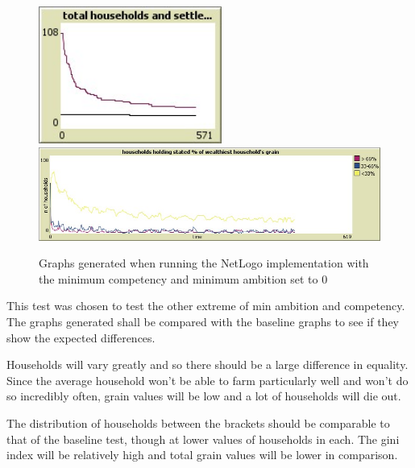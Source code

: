 \documentclass[12pt]{article}
\begin{document}
				\begin{figure}[!htb]
					\includegraphics[width=6cm]{Min_ambition_competency_run1_C}\\
					\includegraphics[width=15cm]{Min_ambition_competency_run1_D}
					\caption{Graphs generated when running the NetLogo implementation with the minimum competency and minimum ambition set to 0}
					\label{fig:Min_ambition_competency_Netlogo_1}
				\end{figure}
				This test was chosen to test the other extreme of min ambition and competency. The graphs generated shall be compared with the baseline graphs to see if they show the expected differences.
				
				Households will vary greatly and so there should be a large difference in equality. Since the average household won’t be able to farm particularly well and won’t do so incredibly often, grain values will be low and a lot of households will die out.
				
				The distribution of households between the brackets should be comparable to that of the baseline test, though at lower values of households in each. The gini index will be relatively high and total grain values will be lower in comparison.
		
\end{document}

